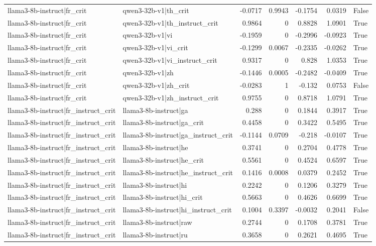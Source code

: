 \begin{table}
\begin{tabular}{l l r r r r l}
llama3-8b-instruct|fr_crit & qwen3-32b-v1|th_crit & -0.0717 & 0.9943 & -0.1754 & 0.0319 & False \\
llama3-8b-instruct|fr_crit & qwen3-32b-v1|th_instruct_crit & 0.9864 & 0 & 0.8828 & 1.0901 & True \\
llama3-8b-instruct|fr_crit & qwen3-32b-v1|vi & -0.1959 & 0 & -0.2996 & -0.0923 & True \\
llama3-8b-instruct|fr_crit & qwen3-32b-v1|vi_crit & -0.1299 & 0.0067 & -0.2335 & -0.0262 & True \\
llama3-8b-instruct|fr_crit & qwen3-32b-v1|vi_instruct_crit & 0.9317 & 0 & 0.828 & 1.0353 & True \\
llama3-8b-instruct|fr_crit & qwen3-32b-v1|zh & -0.1446 & 0.0005 & -0.2482 & -0.0409 & True \\
llama3-8b-instruct|fr_crit & qwen3-32b-v1|zh_crit & -0.0283 & 1 & -0.132 & 0.0753 & False \\
llama3-8b-instruct|fr_crit & qwen3-32b-v1|zh_instruct_crit & 0.9755 & 0 & 0.8718 & 1.0791 & True \\
llama3-8b-instruct|fr_instruct_crit & llama3-8b-instruct|ga & 0.288 & 0 & 0.1844 & 0.3917 & True \\
llama3-8b-instruct|fr_instruct_crit & llama3-8b-instruct|ga_crit & 0.4458 & 0 & 0.3422 & 0.5495 & True \\
llama3-8b-instruct|fr_instruct_crit & llama3-8b-instruct|ga_instruct_crit & -0.1144 & 0.0709 & -0.218 & -0.0107 & True \\
llama3-8b-instruct|fr_instruct_crit & llama3-8b-instruct|he & 0.3741 & 0 & 0.2704 & 0.4778 & True \\
llama3-8b-instruct|fr_instruct_crit & llama3-8b-instruct|he_crit & 0.5561 & 0 & 0.4524 & 0.6597 & True \\
llama3-8b-instruct|fr_instruct_crit & llama3-8b-instruct|he_instruct_crit & 0.1416 & 0.0008 & 0.0379 & 0.2452 & True \\
llama3-8b-instruct|fr_instruct_crit & llama3-8b-instruct|hi & 0.2242 & 0 & 0.1206 & 0.3279 & True \\
llama3-8b-instruct|fr_instruct_crit & llama3-8b-instruct|hi_crit & 0.5663 & 0 & 0.4626 & 0.6699 & True \\
llama3-8b-instruct|fr_instruct_crit & llama3-8b-instruct|hi_instruct_crit & 0.1004 & 0.3397 & -0.0032 & 0.2041 & False \\
llama3-8b-instruct|fr_instruct_crit & llama3-8b-instruct|raw & 0.2744 & 0 & 0.1708 & 0.3781 & True \\
llama3-8b-instruct|fr_instruct_crit & llama3-8b-instruct|ru & 0.3658 & 0 & 0.2621 & 0.4695 & True \\

\end{tabular}
\end{table}
